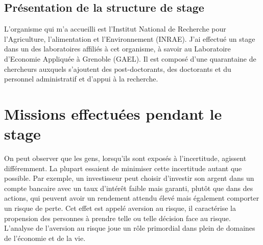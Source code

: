 \documentclass[12pt]{article}
\begin{document}
\subsection{Présentation de la structure de stage}

L'organisme qui m'a accueilli est l'Institut National de Recherche pour
l'Agriculture, l'alimentation et l'Environnement (INRAE). J'ai effectué
un stage dans un des laboratoires affiliés à cet organisme, à savoir au
Laboratoire d'Economie Appliquée à Grenoble (GAEL). Il est composé d'une
quarantaine de chercheurs auxquels s'ajoutent des post-doctorants, des
doctorants et du personnel administratif et d'appui à la recherche.

\section{Missions effectuées pendant le stage}
\label{sec:third}

On peut observer que les gens, lorsqu'ils sont exposés à l'incertitude,
agissent différemment. La plupart essaient de minimiser cette
incertitude autant que possible. Par exemple, un investisseur peut
choisir d'investir son argent dans un compte bancaire avec un taux
d'intérêt faible mais garanti, plutôt que dans des actions, qui peuvent
avoir un rendement attendu élevé mais également comporter un risque de
perte. Cet effet est appelé aversion au risque, il caractérise la
propension des personnes à prendre telle ou telle décision face au
risque. L'analyse de l'aversion au risque joue un rôle primordial dans
plein de domaines de l'économie et de la vie.
\end{document}
